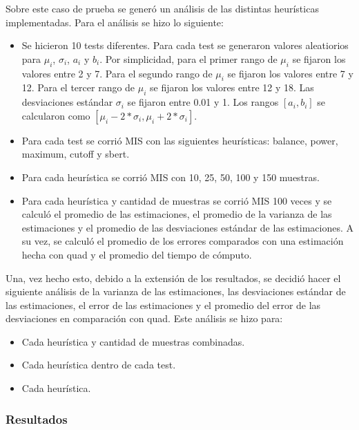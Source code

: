 \documentclass{article}
\begin{document}
Sobre este caso de prueba se generó un análisis de las distintas heurísticas implementadas.
Para el análisis se hizo lo siguiente:
\begin{itemize}
    \item Se hicieron 10 tests diferentes. Para cada test se generaron valores aleatiorios para \( \mu_{i} \), \( \sigma_{i} \), \( a_{i} \) y \( b_{i} \).
          Por simplicidad, para el primer rango de  \( \mu_{i} \) se fijaron los valores entre 2 y 7.
          Para el segundo rango de \( \mu_{i} \) se fijaron los valores entre 7 y 12.
          Para el tercer rango de \( \mu_{i} \) se fijaron los valores entre 12 y 18.
          Las desviaciones estándar \( \sigma_{i} \) se fijaron entre 0.01 y 1.
          Los rangos \( [a_{i}, b_{i}] \) se calcularon como \( [ \mu_{i} - 2 * \sigma_{i}, \mu_{i} + 2 * \sigma_{i} ] \).
    \item Para cada test se corrió MIS con las siguientes heurísticas: balance, power, maximum, cutoff y sbert.
    \item Para cada heurística se corrió MIS con 10, 25, 50, 100 y 150 muestras.
    \item Para cada heurística y cantidad de muestras se corrió MIS 100 veces y se calculó el promedio de las estimaciones,
          el promedio de la varianza de las estimaciones y el promedio de las desviaciones estándar de las estimaciones.
          A su vez, se calculó el promedio de los errores comparados con una estimación hecha con quad y el promedio del tiempo de cómputo.
\end{itemize}

Una, vez hecho esto, debido a la extensión de los resultados, se decidió hacer el siguiente análisis de la varianza de las estimaciones, las desviaciones estándar de las estimaciones, el error de las estimaciones y el promedio del error de las desviaciones en comparación con quad.
Este análisis se hizo para:

\begin{itemize}
    \item Cada heurística y cantidad de muestras combinadas.
    \item Cada heurística dentro de cada test.
    \item Cada heurística.
\end{itemize}

\subsubsection*{Resultados}
\end{document}
